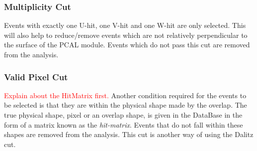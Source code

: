 \subsubsection{Multiplicity Cut}
Events with exactly one U-hit, one V-hit and one W-hit are only selected. This will also help to reduce/remove events which are not
relatively perpendicular to the surface of the PCAL module. Events which do not pass this cut are removed from the analysis.

\subsubsection{Valid Pixel Cut}
\textcolor{red}{Explain about the HitMatrix first.} Another condition required for the events to be selected is that they are
within the physical shape made by the overlap. The true physical shape, pixel or an overlap shape, is given in the DataBase in the 
form of a matrix known as the \textit{hit-matrix}. Events that do not fall within these shapes are removed from the analysis. This cut
is another way of using the Dalitz cut.
\FloatBarrier

\FloatBarrier
